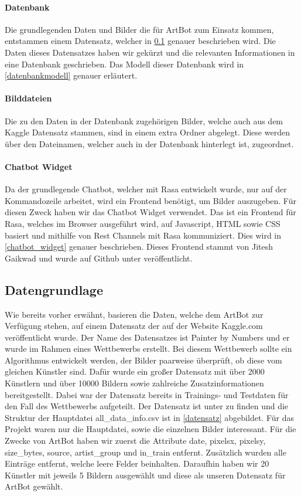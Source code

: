 \paragraph{Datenbank}
Die grundlegenden Daten und Bilder die für ArtBot zum Einsatz kommen, entstammen einem Datensatz, welcher in \ref{daten} genauer beschrieben wird. Die Daten dieses Datensatzes haben wir gekürzt und die relevanten Informationen in eine Datenbank geschrieben. Das Modell dieser Datenbank wird in \ref{datenbankmodell} genauer erläutert.

\paragraph{Bilddateien}
Die zu den Daten in der Datenbank zugehörigen Bilder, welche auch aus dem Kaggle Datensatz stammen, sind in einem extra Ordner abgelegt. Diese werden über den Dateinamen, welcher auch in der Datenbank hinterlegt ist, zugeordnet. 

\paragraph{Chatbot Widget}
Da der grundlegende Chatbot, welcher mit Rasa entwickelt wurde, nur auf der Kommandozeile arbeitet, wird ein Frontend benötigt, um Bilder auszugeben. Für diesen Zweck haben wir das Chatbot Widget verwendet. Das ist ein Frontend für Rasa, welches im Browser ausgeführt wird, auf Javascript, HTML sowie CSS basiert und mithilfe von Rest Channels mit Rasa kommuniziert. Dies wird in \ref{chatbot_widget} genauer beschrieben. Dieses Frontend stammt von Jitesh Gaikwad und wurde auf Github unter \cite{chatbot_widget} veröffentlicht.

\subsection{Datengrundlage}\label{daten}
Wie bereits vorher erwähnt, basieren die Daten, welche dem ArtBot zur Verfügung stehen, auf einem Datensatz der auf der Website Kaggle.com veröffentlicht wurde. Der Name des Datensatzes ist Painter by Numbers und er wurde im Rahmen eines Wettbewerbs erstellt. Bei diesem Wettbewerb sollte ein Algorithmus entwickelt werden, der Bilder paarweise überprüft, ob diese vom gleichen Künstler sind. Dafür wurde ein großer Datensatz mit über 2000 Künstlern und über 10000 Bildern sowie zahlreiche Zusatzinformationen bereitgestellt. Dabei war der Datensatz bereits in Trainings- und Testdaten für den Fall des Wettbewerbs aufgeteilt. Der Datensatz ist unter \cite{datensatz} zu finden und die Struktur der Hauptdatei all\_data\_info.csv ist in \ref{datensatz} abgebildet. Für das Projekt waren nur die Hauptdatei, sowie die einzelnen Bilder interessant. Für die Zwecke von ArtBot haben wir zuerst die Attribute date, pixelsx, pixelsy, size\_bytes, source, artist\_group und in\_train entfernt. Zusätzlich wurden alle Einträge entfernt, welche leere Felder beinhalten. Daraufhin haben wir 20 Künstler mit jeweils 5 Bildern ausgewählt und diese als unseren Datensatz für ArtBot gewählt.

